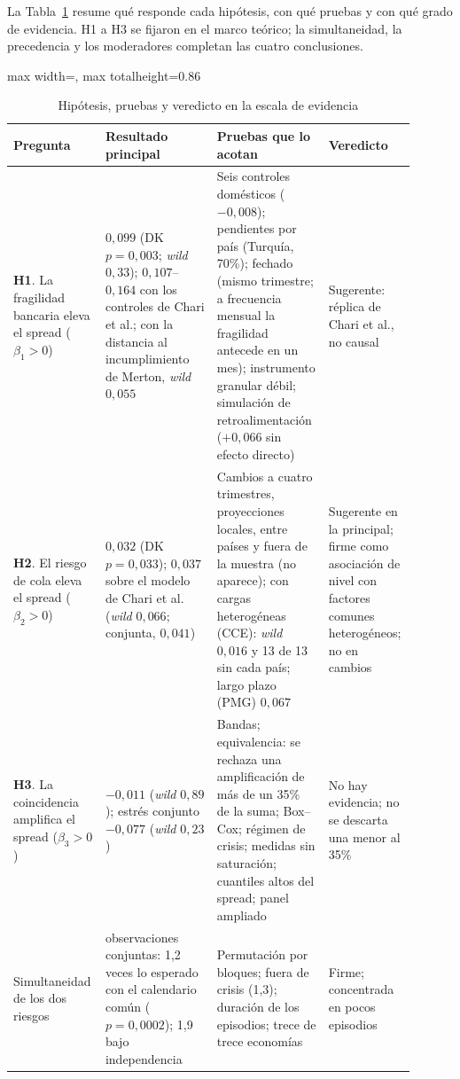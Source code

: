 La Tabla~\ref{tab:veredictos} resume qué responde cada hipótesis, con qué pruebas y con qué grado de evidencia. H1 a H3 se fijaron en el marco teórico; la simultaneidad, la precedencia y los moderadores completan las cuatro conclusiones.

\begin{table}[p]
\centering
\scriptsize
\caption[Hipótesis, pruebas y veredicto]{Hipótesis, pruebas y veredicto en la escala de evidencia}
\label{tab:veredictos}
\begin{adjustbox}{max width=\linewidth, max totalheight=0.86\textheight}
\begin{tabular}{>{\raggedright\arraybackslash}p{0.19\linewidth}>{\raggedright\arraybackslash}p{0.27\linewidth}>{\raggedright\arraybackslash}p{0.27\linewidth}>{\raggedright\arraybackslash}p{0.17\linewidth}}
\toprule
Pregunta & Resultado principal & Pruebas que lo acotan & Veredicto \\
\midrule
\textbf{H1}. La fragilidad bancaria eleva el spread ($\beta_1>0$) & $0{,}099$ (DK $p=0{,}003$; \textit{wild} $0{,}33$); $0{,}107$--$0{,}164$ con los controles de Chari et al.; con la distancia al incumplimiento de Merton, \textit{wild} $0{,}055$ & Seis controles domésticos ($-0{,}008$); pendientes por país (Turquía, 70\%); fechado (mismo trimestre; a frecuencia mensual la fragilidad antecede en un mes); instrumento granular débil; simulación de retroalimentación ($+0{,}066$ sin efecto directo) & Sugerente: réplica de Chari et al., no causal \\
\addlinespace
\textbf{H2}. El riesgo de cola eleva el spread ($\beta_2>0$) & $0{,}032$ (DK $p=0{,}033$); $0{,}037$ sobre el modelo de Chari et al. (\textit{wild} $0{,}066$; conjunta, $0{,}041$) & Cambios a cuatro trimestres, proyecciones locales, entre países y fuera de la muestra (no aparece); con cargas heterogéneas (CCE): \textit{wild} $0{,}016$ y 13 de 13 sin cada país; largo plazo (PMG) $0{,}067$ & Sugerente en la principal; firme como asociación de nivel con factores comunes heterogéneos; no en cambios \\
\addlinespace
\textbf{H3}. La coincidencia amplifica el spread ($\beta_3>0$) & $-0{,}011$ (\textit{wild} $0{,}89$); estrés conjunto $-0{,}077$ (\textit{wild} $0{,}23$) & Bandas; equivalencia: se rechaza una amplificación de más de un 35\% de la suma; Box--Cox; régimen de crisis; medidas sin saturación; cuantiles altos del spread; panel ampliado & No hay evidencia; no se descarta una menor al 35\% \\
\addlinespace
Simultaneidad de los dos riesgos & 168 observaciones conjuntas: 1,2 veces lo esperado con el calendario común ($p=0{,}0002$); 1,9 bajo independencia & Permutación por bloques; fuera de crisis (1,3); duración de los episodios; trece de trece economías & Firme; concentrada en pocos episodios \\

\end{tabular}
\end{adjustbox}
\end{table}
